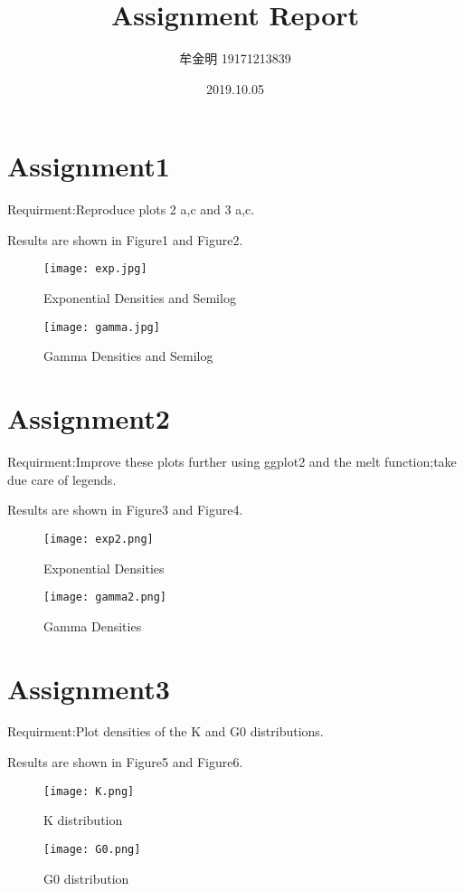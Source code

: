 \documentclass{article}
\title{Assignment Report}
\author{牟金明 19171213839}
\date{2019.10.05}
\begin{document}
	\maketitle
	\section{Assignment1}
	Requirment:Reproduce plots 2 a,c and 3 a,c.
	
	Results are shown in Figure1 and Figure2.
	\begin{figure}[ht]
		\centering
		\texttt{[image: exp.jpg]}
		\caption{Exponential Densities and Semilog}
		\label{fig1}
	\end{figure}
	\begin{figure}[ht]
		\centering
		\texttt{[image: gamma.jpg]}
		\caption{Gamma Densities and Semilog}
		\label{fig2}
	\end{figure}
	
	\maketitle
	\section{Assignment2}
	Requirment:Improve these plots further using ggplot2 and the melt function;take due care of legends.
	
	Results are shown in Figure3 and Figure4.
	\begin{figure}[ht]
		\centering
		\texttt{[image: exp2.png]}
		\caption{Exponential Densities}
		\label{fig3}
	\end{figure}
	\begin{figure}[ht]
		\centering
		\texttt{[image: gamma2.png]}
		\caption{Gamma Densities}
		\label{fig4}
	\end{figure}

	\maketitle
	\section{Assignment3}
	Requirment:Plot densities of the K and G0 distributions.
	
	Results are shown in Figure5 and Figure6.
	\begin{figure}[ht]
		\centering
		\texttt{[image: K.png]}
		\caption{K distribution}
		\label{fig5}
	\end{figure}
	\begin{figure}[ht]
		\centering
		\texttt{[image: G0.png]}
		\caption{G0 distribution}
		\label{fig6}
	\end{figure}
\end{document}
